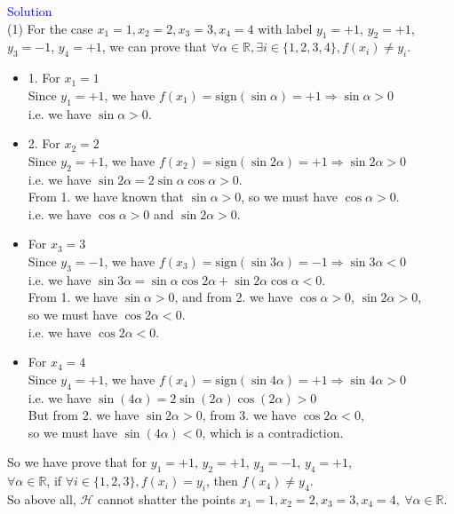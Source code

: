 \textcolor{blue}{Solution}\\
(1) For the case $x_1=1, x_2=2, x_3=3, x_4=4$ with label $y_1=+1$, $y_2=+1$, $y_3=-1$, $y_4=+1$,
we can prove that $\forall\alpha\in\mathbb{R},\exists i\in\{1,2,3,4\},f(x_i)\neq y_i$.
\begin{itemize}
    \item 1. For $x_1=1$\\
    Since $y_1=+1$, we have $f(x_1)=\text{sign}(\sin\alpha)=+1\Rightarrow \sin\alpha>0$\\
    i.e. we have $\sin\alpha>0$.

    \item 2. For $x_2=2$\\
    Since $y_2=+1$, we have $f(x_2)=\text{sign}(\sin 2\alpha)=+1\Rightarrow \sin 2\alpha>0$\\
    i.e. we have $\sin 2\alpha=2\sin\alpha\cos\alpha>0$.\\
    From 1. we have known that $\sin\alpha>0$, so we must have $\cos\alpha>0$.\\
    i.e. we have $\cos\alpha>0$ and $\sin 2\alpha>0$.
    
    \item For $x_3=3$\\ 
    Since $y_3=-1$, we have $f(x_3)=\text{sign}(\sin 3\alpha)=-1\Rightarrow \sin 3\alpha<0$\\
    i.e. we have $\sin 3\alpha=\sin\alpha\cos 2\alpha+\sin 2\alpha\cos\alpha<0$.\\
    From 1. we have $\sin\alpha>0$, and from 2. we have $\cos\alpha>0$, $\sin 2\alpha>0$,\\
    so we must have $\cos 2\alpha<0$.\\
    i.e. we have $\cos 2\alpha<0$.

    \item For $x_4=4$\\
    Since $y_4=+1$, we have $f(x_4)=\text{sign}(\sin 4\alpha)=+1\Rightarrow \sin 4\alpha>0$\\
    i.e. we have $\sin(4\alpha)=2\sin(2\alpha)\cos(2\alpha)>0$\\
    But from 2. we have $\sin 2\alpha>0$, from 3. we have $\cos 2\alpha<0$,\\
    so we must have $\sin(4\alpha)<0$, which is a contradiction.
\end{itemize}

So we have prove that for $y_1=+1$, $y_2=+1$, $y_3=-1$, $y_4=+1$, \\$\forall\alpha\in\mathbb{R}$, if $\forall i\in\{1,2,3\},f(x_i)= y_i$, then $f(x_4)\neq y_4$.\\
So above all, $\mathcal{H}$ cannot shatter the points $x_1=1, x_2=2, x_3=3, x_4=4, \ \forall \alpha\in\mathbb{R}$.\\

